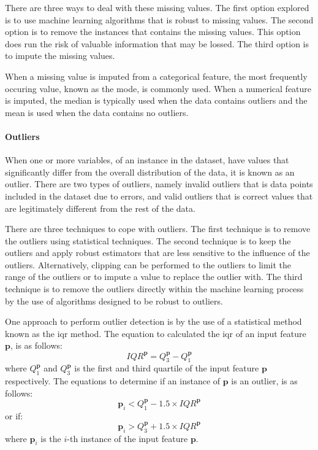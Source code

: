 \documentclass[10pt, conference]{IEEEtran}
\begin{document}
There are three ways to deal with these missing values. The first option explored is to use machine learning
algorithms that is robust to missing values. The second option is to remove the instances that contains the
missing values. This option does run the risk of valuable information that may be lossed. The third option
is to impute the missing values.

When a missing value is imputed from a categorical feature, the most frequently occuring value, known as the mode,
is commonly used. When a numerical feature is imputed, the median is typically used when the data contains outliers
and the mean is used when the data contains no outliers. 

\paragraph{Outliers}

When one or more variables, of an instance in the dataset, have values that significantly differ from the overall distribution
of the data, it is known as an outlier. There are two types of outliers, namely invalid outliers that is data points included
in the dataset due to errors, and valid outliers that is correct values that are legitimately different from the rest
of the data.

There are three techniques to cope with outliers. The first technique is to remove the outliers using statistical
techniques. The second technique is to keep the outliers and apply robust estimators that are less sensitive to the
influence of the outliers. Alternatively, clipping can be performed to the outliers to limit the range of the outliers
or to impute a value to replace the outlier with. The third technique is to remove the outliers directly within the
machine learning process by the use of algorithms designed to be robust to outliers.

One approach to perform outlier detection is by the use of a statistical method known as the \acrfull{iqr} method.
The equation to calculated the \acrshort{iqr} of an input feature $\boldsymbol{\textbf{p}}$, is as follows:
\begin{equation}
    IQR^{\boldsymbol{\textbf{p}}} = Q_3^{\boldsymbol{\textbf{p}}} - Q_1^{\boldsymbol{\textbf{p}}} \label{IQR}
\end{equation}
where $Q_1^{\boldsymbol{\textbf{p}}}$ and $Q_3^{\boldsymbol{\textbf{p}}}$ is the first and third quartile of the input
feature ${\boldsymbol{\textbf{p}}}$ respectively. The equations to determine if an instance of ${\boldsymbol{\textbf{p}}}$
is an outlier, is as follows:
\begin{equation}
    \boldsymbol{\textbf{p}}_i < Q_1^{\boldsymbol{\textbf{p}}} - 1.5 \times IQR^{\boldsymbol{\textbf{p}}} \label{outlier_smaller}
\end{equation}
or if:
\begin{equation}
    \boldsymbol{\textbf{p}}_i > Q_3^{\boldsymbol{\textbf{p}}} + 1.5 \times IQR^{\boldsymbol{\textbf{p}}} \label{outlier_larger}
\end{equation}
where $\boldsymbol{\textbf{p}}_i$ is the $i$-th instance of the input feature ${\boldsymbol{\textbf{p}}}$.
\end{document}
